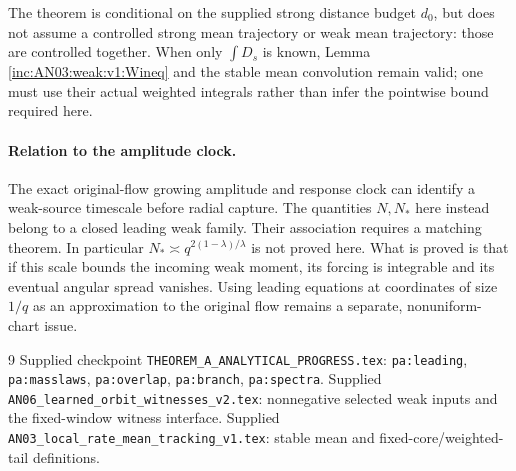 \documentclass[11pt]{article}
\numberwithin{equation}{section}
\theoremstyle{remark}\newtheorem{remark}[theorem]{Remark}
\begin{document}
The theorem is conditional on the supplied strong distance budget $d_0$, but does not assume a controlled strong mean trajectory or weak mean trajectory: those are controlled together. When only $\int D_s$ is known, Lemma \ref{inc:AN03:weak:v1:Wineq} and the stable mean convolution remain valid; one must use their actual weighted integrals rather than infer the pointwise bound required here.

\paragraph{Relation to the amplitude clock.}
The exact original-flow growing amplitude and response clock can identify a weak-source timescale before radial capture. The quantities $N,N_*$ here instead belong to a closed leading weak family. Their association requires a matching theorem. In particular $N_*\asymp q^{2(1-\lambda)/\lambda}$ is not proved here. What is proved is that if this scale bounds the incoming weak moment, its forcing is integrable and its eventual angular spread vanishes. Using leading equations at coordinates of size $1/q$ as an approximation to the original flow remains a separate, nonuniform-chart issue.

\begin{thebibliography}{9}\small
{} Supplied checkpoint \texttt{THEOREM\_A\_ANALYTICAL\_PROGRESS.tex}: \texttt{pa:leading}, \texttt{pa:masslaws}, \texttt{pa:overlap}, \texttt{pa:branch}, \texttt{pa:spectra}.
 Supplied \texttt{AN06\_learned\_orbit\_witnesses\_v2.tex}: nonnegative selected weak inputs and the fixed-window witness interface.
 Supplied \texttt{AN03\_local\_rate\_mean\_tracking\_v1.tex}: stable mean and fixed-core/weighted-tail definitions.
\end{thebibliography}
\end{document}
